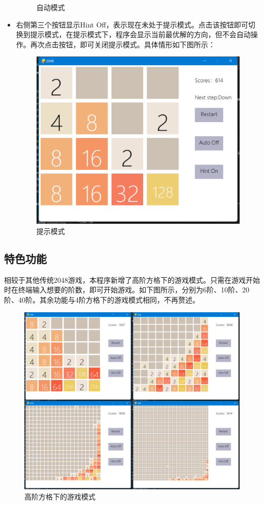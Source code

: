 \documentclass[UTF8,AutoFakeBold,AutoFakeSlant,zihao=-4]{ctexart}
\begin{document}
\begin{itemize}
\begin{figure}[H]
      \caption{自动模式}
      \label{fig:mergesort}
    \end{figure}
  \item 右侧第三个按钮显示Hint Off，表示现在未处于提示模式。点击该按钮即可切换到提示模式，在提示模式下，程序会显示当前最优解的方向，但不会自动操作。再次点击按钮，即可关闭提示模式。具体情形如下图所示：
    \begin{figure}[H]
      \centering
      \includegraphics[width=0.5\linewidth]{img/pic7.png}
      \caption{提示模式}
      \label{fig:mergesort}
    \end{figure}
\end{itemize}

\subsection{特色功能}
相较于其他传统2048游戏，本程序新增了高阶方格下的游戏模式。只需在游戏开始时在终端输入想要的阶数，即可开始游戏。如下图所示，分别为6阶、10阶、20阶、40阶。其余功能与4阶方格下的游戏模式相同，不再赘述。
\begin{figure}[H]
  \centering
  \includegraphics[width=0.55\linewidth]{img/pic12.png}
  \caption{高阶方格下的游戏模式}
  \label{fig:mergesort}
\end{figure}
\end{document}
